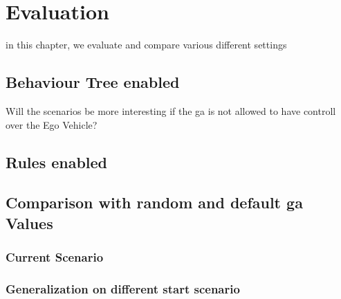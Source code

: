 \chapter{Evaluation}
\label{chap:evaluation}
in this chapter, we evaluate and compare various different settings



\section{Behaviour Tree enabled}
Will the scenarios be more interesting if the ga is not allowed to have controll over the Ego Vehicle?

\section{Rules enabled}

\section{Comparison with random and default ga Values}
\subsection{Current Scenario}

\subsection{Generalization on different start scenario}
